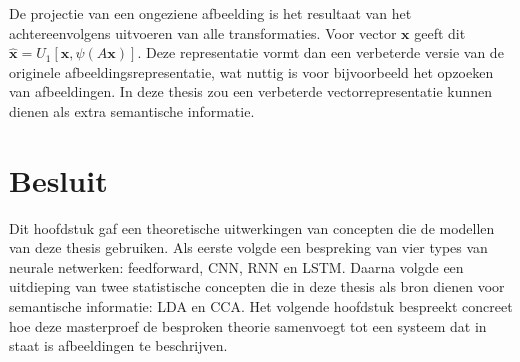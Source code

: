 De projectie van een ongeziene afbeelding is het resultaat van het achtereenvolgens uitvoeren van alle transformaties. Voor vector $\mathbf{x}$ geeft dit $\mathbf{\hat{x}} = U_1[\mathbf{x}, \psi(A\mathbf{x})]$. Deze representatie vormt dan een verbeterde versie van de originele afbeeldingsrepresentatie, wat nuttig is voor bijvoorbeeld het opzoeken van afbeeldingen. In deze thesis zou een verbeterde vectorrepresentatie kunnen dienen als extra semantische informatie. 

\section{Besluit}
Dit hoofdstuk gaf een theoretische uitwerkingen van concepten die de modellen van deze thesis gebruiken. Als eerste volgde een bespreking van vier types van neurale netwerken: feedforward, CNN, RNN en LSTM. Daarna volgde een uitdieping van twee statistische concepten die in deze thesis als bron dienen voor semantische informatie: LDA en CCA. Het volgende hoofdstuk bespreekt concreet hoe deze masterproef de besproken theorie samenvoegt tot een systeem dat in staat is afbeeldingen te beschrijven.
